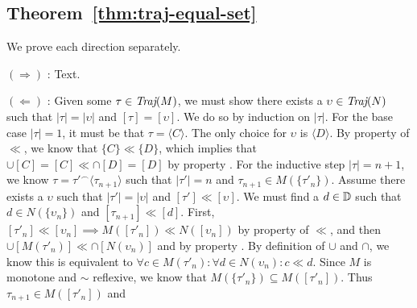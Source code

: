 \subsection{Theorem~\ref{thm:traj-equal-set}}

We prove each direction separately.

$(\Rightarrow)$ : Text.

$(\Leftarrow)$ : Given some $\tau \in \operatorname{\textit{Traj}}(M)$, we must show there exists a $\upsilon \in \operatorname{\textit{Traj}}(N)$ such that $| \tau | = | \upsilon |$ and $[\tau] = [\upsilon]$. We do so by induction on $| \tau |$. For the base case $| \tau | = 1$, it must be that $\tau = \langle C \rangle$. The only choice for $\upsilon$ is $\langle D \rangle$. By property  of $\ll$, we know that $\{ C \} \ll \{ D \}$, which implies that $\cup [C] = [C] \ll \cap [D] = [D]$ by property . For the inductive step $| \tau | = n + 1$, we know $\tau = \tau'^{\frown}\langle \tau_{n+1} \rangle$ such that $| \tau' | = n$ and $\tau_{n+1} \in M(\{ \tau'_{n} \})$. Assume there exists a $\upsilon$ such that $| \tau' | = | \upsilon |$ and $[\tau'] \ll [\upsilon]$. We must find a $d \in \mathbb{D}$ such that $d \in N(\{ \upsilon_{n }\})$ and $[\tau_{n+1}] \ll [d]$. First, $[\tau'_{n}] \ll [\upsilon_{n}] \implies M([\tau'_{n}]) \ll N([\upsilon_{n}])$ by property  of $\ll$, and then $\cup [M(\tau'_{n})] \ll \cap[N(\upsilon_{n})]$ and by property . By definition of $\cup$ and $\cap$, we know this is equivalent to $\forall c \in M(\tau'_{n}) : \forall d \in N(\upsilon_{n}) : c \ll d$. Since $M$ is monotone and $\sim$ reflexive, we know that $M(\{ \tau'_{n} \}) \subseteq M([ \tau'_{n} ])$. Thus $\tau_{n+1} \in M([ \tau'_{n} ])$ and \todo{\dots}






